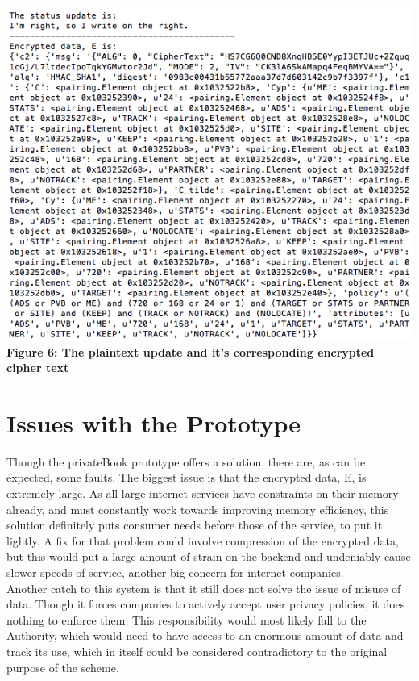 \documentclass[12pt]{article}
\begin{document}
\begin{center}
\includegraphics[scale=.65]{posteddata.png} \\
\textbf{Figure 6: The plaintext update and it's corresponding encrypted cipher text}
\end{center}

\section{Issues with the Prototype}
Though the privateBook prototype offers a solution, there are, as can be expected, some faults. The biggest issue is that the encrypted data, E, is extremely large. As all large internet services have constraints on their memory already, and must constantly work towards improving memory efficiency, this solution definitely puts consumer needs before those of the service, to put it lightly. A fix for that problem could involve compression of the encrypted data, but this would put a large amount of strain on the backend and undeniably cause slower speeds of service, another big concern for internet companies. \\
Another catch to this system is that it still does not solve the issue of misuse of data. Though it forces companies to actively accept user privacy policies, it does nothing to enforce them. This responsibility would most likely fall to the Authority, which would need to have access to an enormous amount of data and track its use, which in itself could be considered contradictory to the original purpose of the scheme. 
\end{document}
